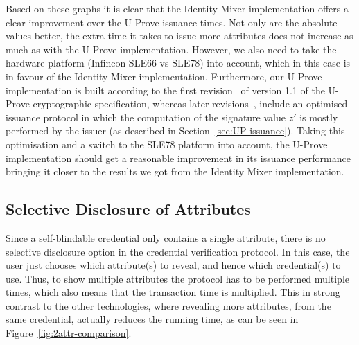 Based on these graphs it is clear that the Identity Mixer implementation offers
a clear improvement over the U-Prove issuance times. Not only are the absolute
values better, the extra time it takes to issue more attributes does not
increase as much as with the U-Prove implementation. However, we also need to
take the hardware platform (Infineon SLE66 vs SLE78) into account, which in this case is in favour of the
Identity Mixer implementation. Furthermore, our U-Prove implementation is built
according to the first revision~\cite{U-Prove_Crypto2011} of version 1.1 of the
U-Prove cryptographic specification, whereas later revisions~\cite{U-Prove_Crypto2013},
include an optimised issuance protocol in which the computation of the signature
value $z'$ is mostly performed by the issuer (as described in Section~\ref{sec:UP-issuance}). Taking
this optimisation and a switch to the SLE78 platform into account, the U-Prove
implementation should get a reasonable improvement in its issuance performance
bringing it closer to the results we got from the Identity Mixer implementation.

\subsection{Selective Disclosure of Attributes}

Since a self-blindable credential only contains a single attribute, there is no
selective disclosure option in the credential verification protocol. In this
case, the user just chooses which attribute(s) to reveal, and hence which
credential(s) to use. Thus, to show multiple attributes the protocol has to be
performed multiple times, which also means that the transaction time is
multiplied. This in strong contrast to the other technologies, where revealing
more attributes, from the same credential, actually reduces the running time, as
can be seen in Figure~\ref{fig:2attr-comparison}.

